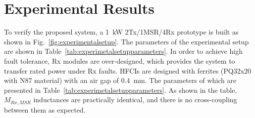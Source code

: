 \documentclass[journal]{IEEEtran}
\begin{document}
\section{Experimental Results }
To verify the proposed system, a 1~kW 2Tx/1MSR/4Rx prototype is built as shown in Fig.~\ref{fig:experimentalsetup}. The parameters of the experimental setup are shown in Table~\ref{tab:experimetalsetupparameters}. In order to achieve high fault tolerance, Rx modules are over-designed, which provides the system to transfer rated power under Rx faults. 
HFCIs are designed with ferrites (PQ32x20 with N87 material) with an air gap of 0.4~mm. The parameters of which are presented in Table~\ref{tab:experimetalsetupparameters}. 
As shown in the table, $M_{Rx,MSR}$ inductances are practically identical, and there is no cross-coupling between them as expected.  
\end{document}
